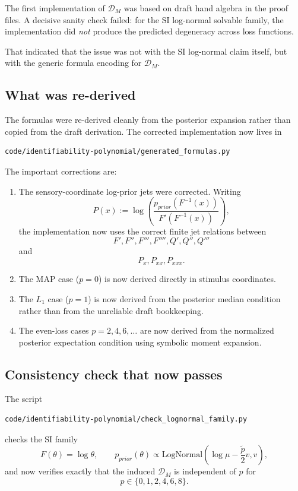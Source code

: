 \documentclass[11pt]{article}
\newcommand{\Prior}{p_{prior}}
\begin{document}
The first implementation of $\mathcal{D}_M$ was based on draft hand algebra in the proof files. A decisive sanity check failed: for the SI log-normal solvable family, the implementation did \emph{not} produce the predicted degeneracy across loss functions.

That indicated that the issue was not with the SI log-normal claim itself, but with the generic formula encoding for $\mathcal{D}_M$.

\subsection{What was re-derived}

The formulas were re-derived cleanly from the posterior expansion rather than copied from the draft derivation. The corrected implementation now lives in
\begin{Verbatim}[fontsize=\small]
code/identifiability-polynomial/generated_formulas.py
\end{Verbatim}

The important corrections are:
\begin{enumerate}
\item The sensory-coordinate log-prior jets were corrected. Writing
\[
P(x) := \log\left(\frac{\Prior(F^{-1}(x))}{F'(F^{-1}(x))}\right),
\]
the implementation now uses the correct finite jet relations between
\[
F',F'',F''',F'''',Q',Q'',Q'''
\]
and
\[
P_x,P_{xx},P_{xxx}.
\]

\item The MAP case ($p=0$) is now derived directly in stimulus coordinates.

\item The $L_1$ case ($p=1$) is now derived from the posterior median condition rather than from the unreliable draft bookkeeping.

\item The even-loss cases $p=2,4,6,\dots$ are now derived from the normalized posterior expectation condition using symbolic moment expansion.
\end{enumerate}

\subsection{Consistency check that now passes}

The script
\begin{Verbatim}[fontsize=\small]
code/identifiability-polynomial/check_lognormal_family.py
\end{Verbatim}
checks the SI family
\[
F(\theta)=\log\theta,
\qquad
\Prior(\theta)\propto \text{LogNormal}\left(\log\mu-\frac{\tilde p}{2}v, v\right),
\]
and now verifies exactly that the induced $\mathcal{D}_M$ is independent of $p$ for
\[
p \in \{0,1,2,4,6,8\}.
\]
\end{document}
